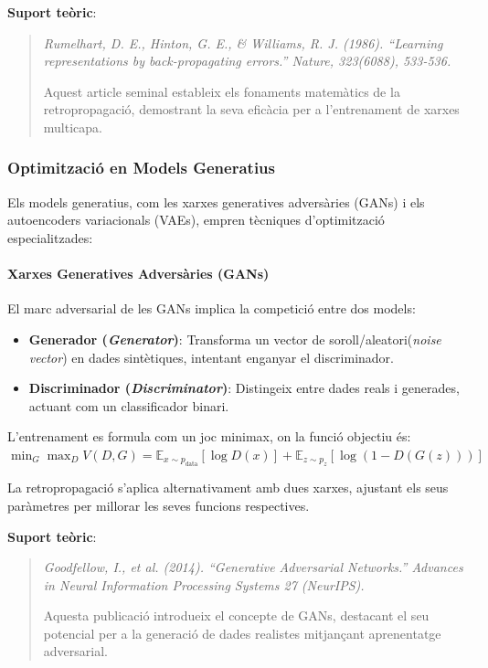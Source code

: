 {\textbf{Suport teòric}:
\begin{quote}
\textit{Rumelhart, D. E., Hinton, G. E., \& Williams, R. J. (1986). ``Learning representations by back-propagating errors.'' Nature, 323(6088), 533-536.}

Aquest article seminal estableix els fonaments matemàtics de la retropropagació, demostrant la seva eficàcia per a l'entrenament de xarxes multicapa.
\end{quote}

\subsubsection{Optimització en Models Generatius}
Els models generatius, com les xarxes generatives adversàries (GANs) i els autoencoders variacionals (VAEs), empren tècniques d'optimització especialitzades:

\paragraph{Xarxes Generatives Adversàries (GANs)}
El marc adversarial de les GANs implica la competició entre dos models:

\begin{itemize}
\item \textbf{Generador (\textit{Generator})}: Transforma un vector de soroll/aleatori(\textit{noise vector}) en dades sintètiques, intentant enganyar el discriminador.

\item \textbf{Discriminador (\textit{Discriminator})}: Distingeix entre dades reals i generades, actuant com un classificador binari.
\end{itemize}

L'entrenament es formula com un joc minimax, on la funció objectiu és:
$ \min_G \max_D V(D, G) = \mathbb{E}_{x \sim p_{\text{data}}}[\log D(x)] + \mathbb{E}_{z \sim p_z}[\log(1 - D(G(z)))] $

La retropropagació s'aplica alternativament amb dues xarxes, ajustant els seus paràmetres per millorar les seves funcions respectives.

\textbf{Suport teòric}:
\begin{quote}
\textit{Goodfellow, I., et al. (2014). ``Generative Adversarial Networks.'' Advances in Neural Information Processing Systems 27 (NeurIPS).}

Aquesta publicació introdueix el concepte de GANs, destacant el seu potencial per a la generació de dades realistes mitjançant aprenentatge adversarial.
\end{quote}

}
